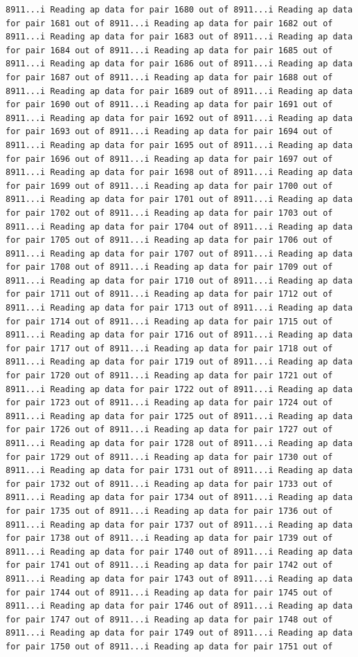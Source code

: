 \documentclass[
]{article}
\begin{document}
\begin{verbatim}
8911...i Reading ap data for pair 1680 out of 8911...i Reading ap data for pair 1681 out of 8911...i Reading ap data for pair 1682 out of 8911...i Reading ap data for pair 1683 out of 8911...i Reading ap data for pair 1684 out of 8911...i Reading ap data for pair 1685 out of 8911...i Reading ap data for pair 1686 out of 8911...i Reading ap data for pair 1687 out of 8911...i Reading ap data for pair 1688 out of 8911...i Reading ap data for pair 1689 out of 8911...i Reading ap data for pair 1690 out of 8911...i Reading ap data for pair 1691 out of 8911...i Reading ap data for pair 1692 out of 8911...i Reading ap data for pair 1693 out of 8911...i Reading ap data for pair 1694 out of 8911...i Reading ap data for pair 1695 out of 8911...i Reading ap data for pair 1696 out of 8911...i Reading ap data for pair 1697 out of 8911...i Reading ap data for pair 1698 out of 8911...i Reading ap data for pair 1699 out of 8911...i Reading ap data for pair 1700 out of 8911...i Reading ap data for pair 1701 out of 8911...i Reading ap data for pair 1702 out of 8911...i Reading ap data for pair 1703 out of 8911...i Reading ap data for pair 1704 out of 8911...i Reading ap data for pair 1705 out of 8911...i Reading ap data for pair 1706 out of 8911...i Reading ap data for pair 1707 out of 8911...i Reading ap data for pair 1708 out of 8911...i Reading ap data for pair 1709 out of 8911...i Reading ap data for pair 1710 out of 8911...i Reading ap data for pair 1711 out of 8911...i Reading ap data for pair 1712 out of 8911...i Reading ap data for pair 1713 out of 8911...i Reading ap data for pair 1714 out of 8911...i Reading ap data for pair 1715 out of 8911...i Reading ap data for pair 1716 out of 8911...i Reading ap data for pair 1717 out of 8911...i Reading ap data for pair 1718 out of 8911...i Reading ap data for pair 1719 out of 8911...i Reading ap data for pair 1720 out of 8911...i Reading ap data for pair 1721 out of 8911...i Reading ap data for pair 1722 out of 8911...i Reading ap data for pair 1723 out of 8911...i Reading ap data for pair 1724 out of 8911...i Reading ap data for pair 1725 out of 8911...i Reading ap data for pair 1726 out of 8911...i Reading ap data for pair 1727 out of 8911...i Reading ap data for pair 1728 out of 8911...i Reading ap data for pair 1729 out of 8911...i Reading ap data for pair 1730 out of 8911...i Reading ap data for pair 1731 out of 8911...i Reading ap data for pair 1732 out of 8911...i Reading ap data for pair 1733 out of 8911...i Reading ap data for pair 1734 out of 8911...i Reading ap data for pair 1735 out of 8911...i Reading ap data for pair 1736 out of 8911...i Reading ap data for pair 1737 out of 8911...i Reading ap data for pair 1738 out of 8911...i Reading ap data for pair 1739 out of 8911...i Reading ap data for pair 1740 out of 8911...i Reading ap data for pair 1741 out of 8911...i Reading ap data for pair 1742 out of 8911...i Reading ap data for pair 1743 out of 8911...i Reading ap data for pair 1744 out of 8911...i Reading ap data for pair 1745 out of 8911...i Reading ap data for pair 1746 out of 8911...i Reading ap data for pair 1747 out of 8911...i Reading ap data for pair 1748 out of 8911...i Reading ap data for pair 1749 out of 8911...i Reading ap data for pair 1750 out of 8911...i Reading ap data for pair 1751 out of 
\end{verbatim}
\end{document}
